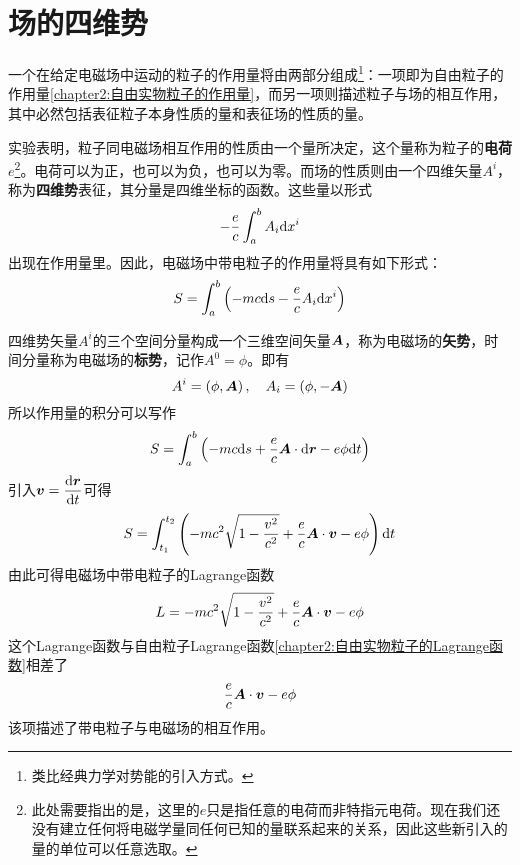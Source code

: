 \section{场的四维势}

一个在给定电磁场中运动的粒子的作用量将由两部分组成\footnote{类比经典力学对势能的引入方式。}：一项即为自由粒子的作用量\eqref{chapter2:自由实物粒子的作用量}，而另一项则描述粒子与场的相互作用，其中必然包括表征粒子本身性质的量和表征场的性质的量。

实验表明，粒子同电磁场相互作用的性质由一个量所决定，这个量称为粒子的{\bf 电荷}$e$\footnote{此处需要指出的是，这里的$e$只是指任意的电荷而非特指元电荷。现在我们还没有建立任何将电磁学量同任何已知的量联系起来的关系，因此这些新引入的量的单位可以任意选取。}。电荷可以为正，也可以为负，也可以为零。而场的性质则由一个四维矢量$A^i$，称为{\bf 四维势}表征，其分量是四维坐标的函数。这些量以形式
\begin{equation*}
	-\frac{e}{c}\int_a^b A_i\mathrm{d} x^i
\end{equation*}
出现在作用量里。因此，电磁场中带电粒子的作用量将具有如下形式：
\begin{equation}
	S = \int_a^b \left(-mc\mathrm{d} s - \frac{e}{c}A_i\mathrm{d} x^i\right)
	\label{chapter3:电磁场中带电粒子的作用量1}
\end{equation}

四维势矢量$A^i$的三个空间分量构成一个三维空间矢量$\boldsymbol{A}$，称为电磁场的{\bf 矢势}，时间分量称为电磁场的{\bf 标势}，记作$A^0 = \phi$。即有
\begin{equation}
	A^i = \left(\phi,\boldsymbol{A}\right),\quad A_i = \left(\phi,-\boldsymbol{A}\right)
	\label{chapter3:电磁场的标势和矢势}
\end{equation}
所以作用量的积分可以写作
\begin{equation*}
	S = \int_a^b \left(-mc\mathrm{d} s + \frac{e}{c}\boldsymbol{A}\cdot \mathrm{d} \boldsymbol{r} - e\phi \mathrm{d} t\right)
\end{equation*}
引入$\boldsymbol{v} = \dfrac{\mathrm{d} \boldsymbol{r}}{\mathrm{d} t}$可得
\begin{equation}
	S = \int_{t_1}^{t_2} \left(-mc^2\sqrt{1-\frac{v^2}{c^2}} + \frac{e}{c}\boldsymbol{A}\cdot \boldsymbol{v} - e\phi\right) \mathrm{d} t
	\label{chapter3:电磁场中带电粒子的作用量2}
\end{equation}
由此可得电磁场中带电粒子的Lagrange函数
\begin{equation}
	L = -mc^2\sqrt{1-\frac{v^2}{c^2}} + \frac{e}{c}\boldsymbol{A}\cdot \boldsymbol{v} - e\phi
	\label{chapter3:电磁场中带电粒子的Lagrange函数}
\end{equation}
这个Lagrange函数与自由粒子Lagrange函数\eqref{chapter2:自由实物粒子的Lagrange函数}相差了
\begin{equation*}
	\frac{e}{c}\boldsymbol{A}\cdot \boldsymbol{v} - e\phi
\end{equation*}
该项描述了带电粒子与电磁场的相互作用。


